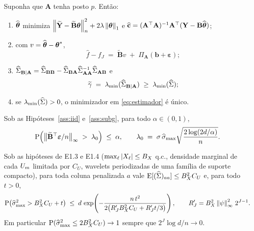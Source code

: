 \documentclass[11pt,a4paper]{article}
\newcommand{\lmin}{\lambda_{\min}}
\newcommand{\Amat}{\mathbf{A}}
\newcommand{\Bmat}{\mathbf{B}}
\newcommand{\Btil}{\widetilde{\Bmat}}
\newcommand{\PA}{\Pi_{\Amat}}
\newcommand{\bveps}{\boldsymbol{\varepsilon}}
\newcommand{\bb}{\mathbf{b}}
\newcommand{\bY}{\mathbf{Y}}
\newcommand{\smax}{\widehat{\sigma}_{\max}}
\newcommand{\gtil}{\widetilde{\gamma}}
\newcommand{\GBA}{\Gramhat_{\Bmat\mid\Amat}}
\begin{document}
\begin{lemma}\label{lem:perfil}
Suponha que $\Amat$ tenha posto $p$. Então:
\begin{enumerate}[label=\textup{(\roman*)}, leftmargin=*, nosep]
  \item $\widehat{\boldsymbol{\theta}}$ minimiza $\normn{\widetilde{\bY} - \Btil\btheta}^{2}
    + 2\pen\norm{\btheta}_{1}$ e
    $\chat = (\Amat\T\Amat)^{-1}\Amat\T(\bY - \Bmat\thetahat)$;
  \item com $v = \widehat{\boldsymbol{\theta}} - \boldsymbol{\theta}^{*}$,
    \begin{equation}
      \label{eq:decomp-fit}
      \widehat{f} - f_{J} \;=\; \Btil v \;+\; \PA(\bb + \bveps);
    \end{equation}
  \item $\GBA = \Gramhat_{\Bmat\Bmat} - \Gramhat_{\Bmat\Amat}
    \Gramhat_{\Amat\Amat}^{-1}\Gramhat_{\Amat\Bmat}$ e
    \begin{equation}
      \label{eq:schur}
      \gtil \;=\; \lmin(\GBA) \;\ge\; \lmin(\Gramhat);
    \end{equation}
  \item se $\lmin(\Gramhat) > 0$, o minimizador em \eqref{eq:estimador} é único.
\end{enumerate}
\end{lemma}

\begin{lemma}\label{lem:calib}
Sob as Hipóteses~\ref{ass:iid} e~\ref{ass:subg}, para todo $\alpha \in (0,1)$,
\[
  \Prob\Bigl( \bigl\lVert \Btil\T\bveps/n \bigr\rVert_{\infty}
  \;>\; \pen_{0} \Bigr) \;\le\; \alpha,
  \qquad
  \pen_{0} \;=\; \sigma\,\smax\sqrt{\frac{2\log(2d/\alpha)}{n}} .
\]
\end{lemma}

\begin{lemma}\label{lem:colunas}
Sob as hipóteses de E1.3 e E1.4 ($\max_{\ell}|X_{\ell}| \le B_{X}$ q.c., densidade
marginal de cada $U_{m}$ limitada por $C_{U}$, wavelets periodizadas de uma
família de suporte compacto), para toda coluna penalizada $a$ vale
$\mathrm{E}[(\widehat{\Sigma})_{aa}] \le B_{X}^{2}C_{U}$ e, para todo $t > 0$,
\[
  \Prob\bigl(\smax^{2} > B_{X}^{2}C_{U} + t\bigr)
  \;\le\; d\,\exp\!\left(-\frac{n\,t^{2}}{2\bigl(R_{J}'B_{X}^{2}C_{U} + R_{J}'t/3\bigr)}\right),
  \qquad R_{J}' = B_{X}^{2}\norm{\psi}_{\infty}^{2}\,2^{J-1}.
\]
Em particular $\Prob(\smax^{2} \le 2B_{X}^{2}C_{U}) \to 1$ sempre que
$2^{J}\log d/n \to 0$.
\end{lemma}
\end{document}
